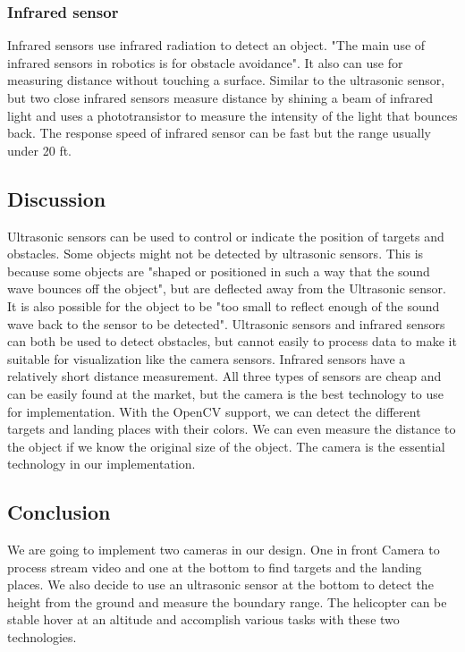 \documentclass[letterpaper, 10, draftclsnofoot, onecolumn,compsoc]{IEEEtran}
\begin{document}
\subsubsection{Infrared sensor}
Infrared sensors use infrared radiation to detect an object. "The main use of infrared sensors in robotics is for obstacle avoidance".\cite{r2} It also can use for measuring distance without touching a surface. Similar to the ultrasonic sensor, but two close infrared sensors measure distance by shining a beam of infrared light and uses a phototransistor to measure the intensity of the light that bounces back. The response speed of infrared sensor can be fast but the range usually under 20 ft.

\subsection{Discussion}
Ultrasonic sensors can be used to control or indicate the position of targets and obstacles. Some objects might not be detected by ultrasonic sensors. This is because some objects are "shaped or positioned in such a way that the sound wave bounces off the object", but are deflected away from the Ultrasonic sensor. It is also possible for the object to be "too small to reflect enough of the sound wave back to the sensor to be detected". \cite{r5} Ultrasonic sensors and infrared sensors can both be used to detect obstacles, but cannot easily to process data to make it suitable for visualization like the camera sensors. Infrared sensors have a relatively short distance measurement. All three types of sensors are cheap and can be easily found at the market, but the camera is the best technology to use for implementation. With the OpenCV support, we can detect the different targets and landing places with their colors. We can even measure the distance to the object if we know the original size of the object. The camera is the essential technology in our implementation.

\subsection{Conclusion}
We are going to implement two cameras in our design. One in front Camera to process stream video and one at the bottom to find targets and the landing places. We also decide to use an ultrasonic sensor at the bottom to detect the height from the ground and measure the boundary range. The helicopter can be stable hover at an altitude and accomplish various tasks with these two technologies.
\end{document}
